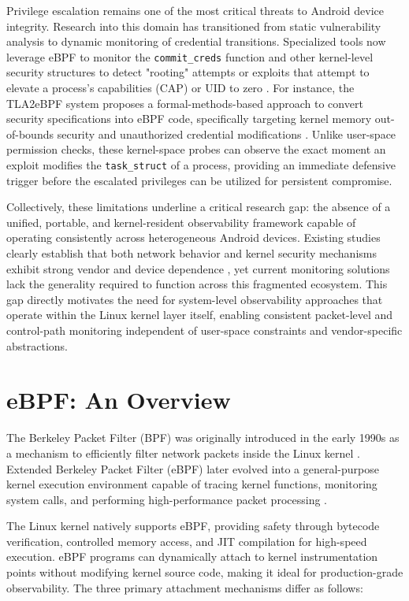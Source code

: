 \documentclass{mnitjaipur}
\begin{document}
\noindent
Privilege escalation remains one of the most critical threats to Android device integrity. Research into this domain has transitioned from static vulnerability analysis to dynamic monitoring of credential transitions. Specialized tools now leverage eBPF to monitor the \texttt{commit\_creds} function and other kernel-level security structures to detect "rooting" attempts or exploits that attempt to elevate a process’s capabilities (CAP) or UID to zero \cite{Torres2024}. For instance, the TLA2eBPF system proposes a formal-methods-based approach to convert security specifications into eBPF code, specifically targeting kernel memory out-of-bounds security and unauthorized credential modifications \cite{Wang2025}. Unlike user-space permission checks, these kernel-space probes can observe the exact moment an exploit modifies the \texttt{task\_struct} of a process, providing an immediate defensive trigger before the escalated privileges can be utilized for persistent compromise.

Collectively, these limitations underline a critical research gap: the absence of a unified, portable, and kernel-resident observability framework capable of operating consistently across heterogeneous Android devices. Existing studies clearly establish that both network behavior and kernel security mechanisms exhibit strong vendor and device dependence \cite{hou2022_firmware, wen2024_vendor_blobs}, yet current monitoring solutions lack the generality required to function across this fragmented ecosystem. This gap directly motivates the need for system-level observability approaches that operate within the Linux kernel layer itself, enabling consistent packet-level and control-path monitoring independent of user-space constraints and vendor-specific abstractions.

\section{eBPF: An Overview}

The Berkeley Packet Filter (BPF) was originally introduced in the early 1990s as a mechanism to efficiently filter network packets inside the Linux kernel \cite{cloudlinux2023}. Extended Berkeley Packet Filter (eBPF) later evolved into a general-purpose kernel execution environment capable of tracing kernel functions, monitoring system calls, and performing high-performance packet processing \cite{ebpf_io}.

\noindent
The Linux kernel natively supports eBPF, providing safety through bytecode verification, controlled memory access, and JIT compilation for high-speed execution. eBPF programs can dynamically attach to kernel instrumentation points without modifying kernel source code, making it ideal for production-grade observability. The three primary attachment mechanisms differ as follows:
\end{document}
